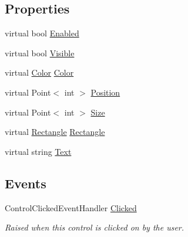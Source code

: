 \subsection*{Properties}
\begin{DoxyCompactItemize}
\item 
virtual bool \hyperlink{class_tri_devs_1_1_tri_engine_1_1_u_i_1_1_control_a8e687133c4c1b48031a89ffb20a2e521}{Enabled}
\item 
virtual bool \hyperlink{class_tri_devs_1_1_tri_engine_1_1_u_i_1_1_control_aef7e44e4b2c71cd422c07b41b8ee7938}{Visible}
\item 
virtual \hyperlink{struct_tri_devs_1_1_tri_engine_1_1_color}{Color} \hyperlink{class_tri_devs_1_1_tri_engine_1_1_u_i_1_1_control_a138269af8c811f2f6e71c39dfc9ba80c}{Color}
\item 
virtual Point$<$ int $>$ \hyperlink{class_tri_devs_1_1_tri_engine_1_1_u_i_1_1_control_af8bc36f7cf6f184a53c1284eddd63327}{Position}
\item 
virtual Point$<$ int $>$ \hyperlink{class_tri_devs_1_1_tri_engine_1_1_u_i_1_1_control_a9d5ef2f07e02300c3a2bfcef62117707}{Size}
\item 
virtual \hyperlink{struct_tri_devs_1_1_tri_engine_1_1_rectangle}{Rectangle} \hyperlink{class_tri_devs_1_1_tri_engine_1_1_u_i_1_1_control_ab9544a7d5067f97206752c1af74ae359}{Rectangle}
\item 
virtual string \hyperlink{class_tri_devs_1_1_tri_engine_1_1_u_i_1_1_control_a607fa471f722b3ff45fcd067c25815f1}{Text}
\end{DoxyCompactItemize}
\subsection*{Events}
\begin{DoxyCompactItemize}
\item 
Control\-Clicked\-Event\-Handler \hyperlink{class_tri_devs_1_1_tri_engine_1_1_u_i_1_1_control_a9a6b05f8c942acf72c13c34a41397579}{Clicked}
\begin{DoxyCompactList}\small\item\em Raised when this control is clicked on by the user. \end{DoxyCompactList}\end{DoxyCompactItemize}


